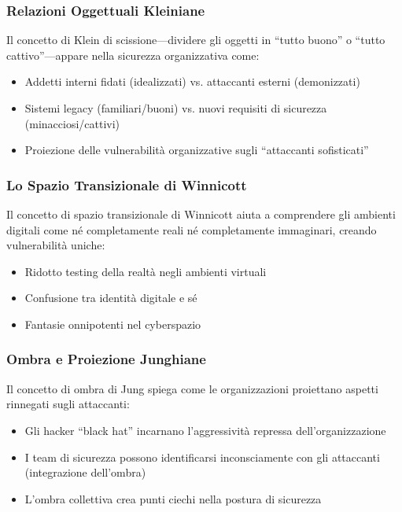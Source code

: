 \documentclass[11pt,a4paper]{article}
\begin{document}
\subsubsection{Relazioni Oggettuali Kleiniane}

Il concetto di Klein\cite{klein1946} di scissione---dividere gli oggetti in ``tutto buono'' o ``tutto cattivo''---appare nella sicurezza organizzativa come:
\begin{itemize}
\item Addetti interni fidati (idealizzati) vs. attaccanti esterni (demonizzati)
\item Sistemi legacy (familiari/buoni) vs. nuovi requisiti di sicurezza (minacciosi/cattivi)
\item Proiezione delle vulnerabilità organizzative sugli ``attaccanti sofisticati''
\end{itemize}

\subsubsection{Lo Spazio Transizionale di Winnicott}

Il concetto di spazio transizionale di Winnicott\cite{winnicott1971} aiuta a comprendere gli ambienti digitali come né completamente reali né completamente immaginari, creando vulnerabilità uniche:
\begin{itemize}
\item Ridotto testing della realtà negli ambienti virtuali
\item Confusione tra identità digitale e sé
\item Fantasie onnipotenti nel cyberspazio
\end{itemize}

\subsubsection{Ombra e Proiezione Junghiane}

Il concetto di ombra di Jung\cite{jung1969} spiega come le organizzazioni proiettano aspetti rinnegati sugli attaccanti:
\begin{itemize}
\item Gli hacker ``black hat'' incarnano l'aggressività repressa dell'organizzazione
\item I team di sicurezza possono identificarsi inconsciamente con gli attaccanti (integrazione dell'ombra)
\item L'ombra collettiva crea punti ciechi nella postura di sicurezza
\end{itemize}
\end{document}
